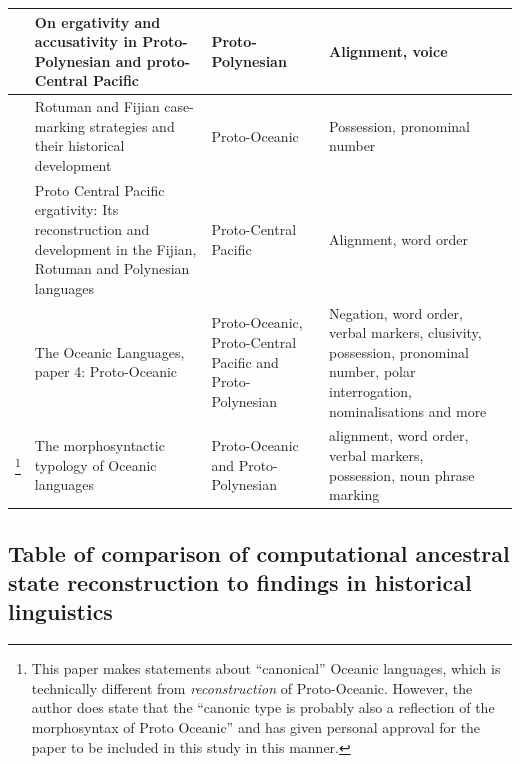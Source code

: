 \documentclass[a4paper,10pt]{article} %
\begin{document}
\begin{longtable}{|p{3cm}|  p{5cm}| p{4cm} | p{3cm}  | p{3cm} |}
\citet{ball2007ergativity} & On ergativity and accusativity in Proto-Polynesian and proto-Central Pacific&Proto-Polynesian & Alignment, voice \\ \hline

\citet{kikusawa2001rotuman} & Rotuman and Fijian case-marking strategies and their historical development  & Proto-Oceanic & Possession, pronominal number \\ \hline

\citet{kikusawa2002proto}  & Proto Central Pacific ergativity: Its reconstruction and development in the Fijian, Rotuman and Polynesian languages & Proto-Central Pacific   & Alignment, word order \\ \hline

\citet{lynchrosscrowley_proto_grammar_oceanic} & The Oceanic Languages, paper 4: Proto-Oceanic & Proto-Oceanic, Proto-Central Pacific and Proto-Polynesian & Negation, word order, verbal markers, clusivity, possession, pronominal number, polar interrogation, nominalisations and more \\ \hline

\citet{ross2004morphosyntactic}\footnote{This paper makes statements about ``canonical'' Oceanic languages, which is technically different from \emph{reconstruction} of Proto-Oceanic. However, the author does state that the ``canonic type is probably also a reflection of the morphosyntax of Proto Oceanic'' \citep[492]{ross2004morphosyntactic} and has given personal approval for the paper to be included in this study in this manner.}  & The morphosyntactic typology of Oceanic languages &  Proto-Oceanic and Proto-Polynesian  & alignment, word order, verbal markers, possession, noun phrase marking \\ \hline
\end{longtable}


\subsection{Table of comparison of computational ancestral state reconstruction to findings in historical linguistics}
\label{asr_table_appendic}
\singlespacing
\begin{landscape}

\end{landscape}
\end{document}
